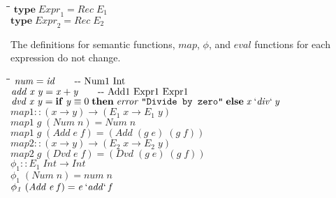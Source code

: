 \documentclass[10pt]{article}
\newlength{\lwidth}\setlength{\lwidth}{4.5cm}
\newlength{\cwidth}\setlength{\cwidth}{8mm} %
\newcommand{\Conid}[1]{\mathit{#1}}
\newcommand{\Varid}[1]{\mathit{#1}}
\begin{document}
\begin{tabbing}
\qquad\=\hspace{\lwidth}\=\hspace{\cwidth}\=\+\kill
${\mathbf{type}\;\Varid{Expr}_1\mathrel{=}\Conid{Rec}\;\Varid{E}_1}$\\
${\mathbf{type}\;\Varid{Expr}_2\mathrel{=}\Conid{Rec}\;\Varid{E}_2}$
\end{tabbing}
The definitions for semantic functions, \ensuremath{\Varid{map}}, \ensuremath{\Varid{\phi}}, and \ensuremath{\Varid{eval}}
functions for each expression do not change.

\begin{tabbing}
\qquad\=\hspace{\lwidth}\=\hspace{\cwidth}\=\+\kill
${\Varid{num}\mathrel{=}\Varid{id}\mbox{\qquad-{}-  Num1 Int}}$\\
${\Varid{add}\;\Varid{x}\;\Varid{y}\mathrel{=}\Varid{x}\mathbin{+}\Varid{y}\mbox{\qquad-{}-  Add1 Expr1 Expr1}}$\\
${\Varid{dvd}\;\Varid{x}\;\Varid{y}\mathrel{=}\mathbf{if}\;\Varid{y}\equiv \mathrm{0}\;\mathbf{then}\;\Varid{error}\;\text{\tt \char34 Divide~by~zero\char34}\;\mathbf{else}\;\Varid{x}\mathbin{\Varid{`div`}}\Varid{y}}$\\
${}$\\
${\Varid{map1}\mathbin{::}(\Varid{x}\to \Varid{y})\to (\Varid{E}_1\;\Varid{x}\to \Varid{E}_1\;\Varid{y})}$\\
${\Varid{map1}\;\Varid{g}\;(\Conid{Num}\;\Varid{n})\mathrel{=}\Conid{Num}\;\Varid{n}}$\\
${\Varid{map1}\;\Varid{g}\;(\Conid{Add}\;\Varid{e}\;\Varid{f})\mathrel{=}(\Conid{Add}\;(\Varid{g}\;\Varid{e})\;(\Varid{g}\;\Varid{f}))}$\\
${}$\\
${\Varid{map2}\mathbin{::}(\Varid{x}\to \Varid{y})\to (\Varid{E}_2\;\Varid{x}\to \Varid{E}_2\;\Varid{y})}$\\
${\Varid{map2}\;\Varid{g}\;(\Conid{Dvd}\;\Varid{e}\;\Varid{f})\mathrel{=}(\Conid{Dvd}\;(\Varid{g}\;\Varid{e})\;(\Varid{g}\;\Varid{f}))}$\\
${}$\\
${\Varid{\phi_1}\mathbin{::}\Varid{E}_1\;\Conid{Int}\to \Conid{Int}}$\\
${\Varid{\phi_1}\;(\Conid{Num}\;\Varid{n})\mathrel{=}\Varid{num}\;\Varid{n}}$\\
${\Varid{\phi_1}\;(\Conid{Add}\;\Varid{e}\;\Varid{f})\mathrel{=}\Varid{e}\mathbin{`\Varid{add}`}\Varid{f}}$\\

\end{tabbing}
\end{document}
